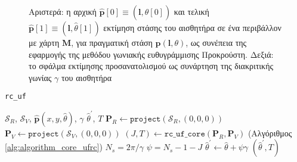 \begin{figure}[!h]\centering
  \vspace{0.5cm}
  
  \vspace{0.5cm}
  \caption{\small Αριστερά: η αρχική
           $\hat{\bm{p}}[0] \equiv (\bm{l},\hat{\theta}[0])$ και τελική
           $\hat{\bm{p}}[1] \equiv (\bm{l},\hat{\theta}[1])$ εκτίμηση στάσης του
           αισθητήρα σε ένα περιβάλλον με χάρτη $\bm{M}$, για πραγματική στάση
           $\bm{p}(\bm{l},\theta)$, ως συνέπεια της εφαρμογής της μεθόδου
           γωνιακής ευθυγράμμισης Προκρούστη. Δεξιά: το σφάλμα εκτίμησης
           προσανατολισμού ως συνάρτηση της διακριτικής γωνίας $\gamma$ του
           αισθητήρα}
  \label{fig:02_04_02:rc_uf}
\end{figure}


\begin{algorithm}[!h]
  \caption{\texttt{rc\_uf}}
  \label{alg:algorithm_ufrc}
  \begin{spacing}{1.3}
  \begin{algorithmic}[1]
    \REQUIRE $\mathcal{S}_R$, $\mathcal{S}_V$, $\hat{\bm{p}}(x, y, \hat{\theta})$, $\gamma$
    \ENSURE $\hat{\theta}^\prime$, $T$
    \STATE $\bm{P}_R \leftarrow \texttt{project}(\mathcal{S}_R, (0,0,0))$
    \STATE $\bm{P}_V \leftarrow \texttt{project}(\mathcal{S}_V, (0,0,0))$
    \STATE $(J,T) \leftarrow \texttt{rc\_uf\_core}(\bm{P}_R, \bm{P}_V)$ (Αλγόριθμος \ref{alg:algorithm_core_ufrc})
    \STATE $N_s = 2 \pi / \gamma$
    \STATE $\psi = N_s - 1 - J$
    \STATE $\hat{\theta}^\prime \leftarrow \hat{\theta} + \psi \gamma$
    \RETURN $(\hat{\theta}^\prime, T)$
  \end{algorithmic}
  \end{spacing}
\end{algorithm}


